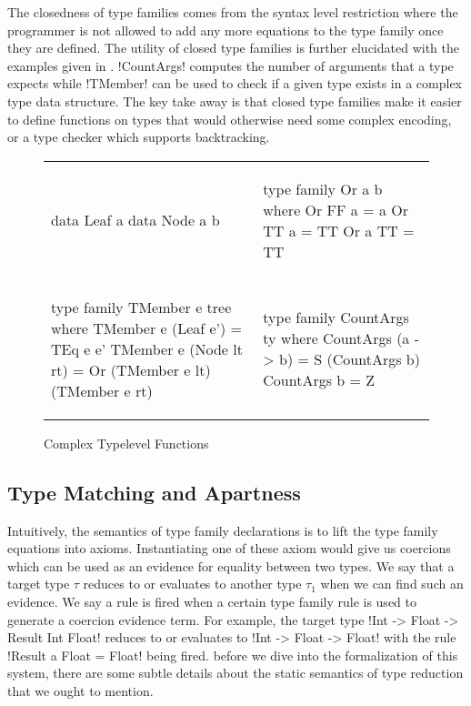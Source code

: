 \documentclass[format=sigplan,manuscript,review,screen,nonacm,margin=1in]{acmart}
\begin{document}
The closedness of type families comes from the syntax level restriction
where the programmer is not allowed to add any more equations to the type family once
they are defined. %
The utility of closed type families is further elucidated with the examples
given in . !CountArgs! computes the number of arguments that a type expects while
!TMember! can be used to check if a given type exists in a complex type data structure.
The key take away is that closed type families make it easier to define functions on types
that would otherwise need some complex encoding, or a type checker which supports backtracking.
\begin{figure}[ht]
  \begin{tabular}{l l}
\begin{code}
data Leaf a
data Node a b
\end{code}&%
\begin{code}
type family Or a b where
  Or FF a = a
  Or TT a = TT
  Or a TT = TT
\end{code}\\
\begin{code}
type family TMember e tree where
  TMember e (Leaf e') = TEq e e'
  TMember e (Node lt rt) = Or (TMember e lt) (TMember e rt)
\end{code}&%
\begin{code}
type family CountArgs ty where
  CountArgs (a -> b) = S (CountArgs b)
  CountArgs b        = Z
\end{code}
  \end{tabular}
  \caption{Complex Typelevel Functions}
  \label{fig:tf-closed-examples}
\end{figure}

\subsection{Type Matching and Apartness}\label{subsec:tf-closed-apartness}
Intuitively, the semantics of type family declarations is to lift the type family equations into axioms.
Instantiating one of these axiom would give us coercions which can be
used as an evidence for equality between two types. We say that a target type $\tau$
reduces to or evaluates to another type $\tau_1$ when we can
find such an evidence. We say a rule is fired when a certain type family rule is used
to generate a coercion evidence term. For example, the target type !Int -> Float -> Result Int Float!
reduces to or evaluates to !Int -> Float -> Float! with the rule !Result a Float = Float! being fired.
before we dive into the formalization of this system, there are some subtle details about
the static semantics of type reduction that we ought to mention.%
\end{document}
